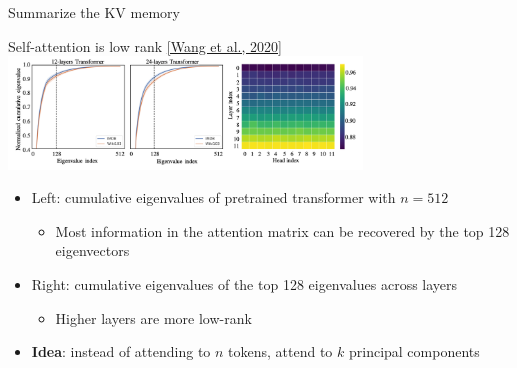 \documentclass[usenames,dvipsnames,notes,11pt,aspectratio=169,hyperref={colorlinks=true, linkcolor=blue}]{beamer}
\begin{document}
\begin{frame}
\begin{columns}
\begin{column}{0.6\textwidth}

        \end{column}
    \end{columns}
\end{frame}

\begin{frame}
    {Summarize the KV memory}

    Self-attention is low rank \href{https://arxiv.org/pdf/2006.04768.pdf}{[Wang et al., 2020]}\\[1ex]
    \includegraphics[height=3cm]{figures/low-rank}

    \begin{itemize}[<+->]
        \item Left: cumulative eigenvalues of pretrained transformer with $n=512$
            \begin{itemize}
                \item Most information in the attention matrix can be recovered by the top 128 eigenvectors %
            \end{itemize}
        \item Right: cumulative eigenvalues of the top 128 eigenvalues across layers 
            \begin{itemize}
                \item Higher layers are more low-rank 
            \end{itemize}
        \item \textbf{Idea}: instead of attending to $n$ tokens, attend to $k$ principal components 
    \end{itemize}
\end{frame}
\end{document}
